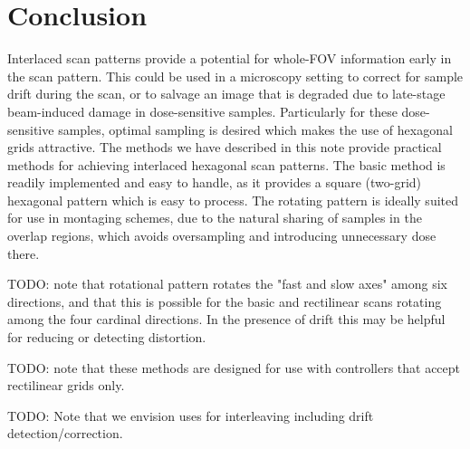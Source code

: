 \documentclass{article}
\begin{document}
\section{Conclusion}
\label{sec:conclusion}

Interlaced scan patterns provide a potential for whole-FOV information early in the scan pattern.
%
This could be used in a microscopy setting to correct for sample drift during the scan, or to salvage an image that is degraded due to late-stage beam-induced damage in dose-sensitive samples.
%
Particularly for these dose-sensitive samples, optimal sampling is desired which makes the use of hexagonal grids attractive.
%
The methods we have described in this note provide practical methods for achieving interlaced hexagonal scan patterns.
%
The basic method is readily implemented and easy to handle, as it provides a square (two-grid) hexagonal pattern which is easy to process.
%
The rotating pattern is ideally suited for use in montaging schemes, due to the natural sharing of samples in the overlap regions, which avoids oversampling and introducing unnecessary dose there.


TODO: note that rotational pattern rotates the "fast and slow axes" among six directions, and that this is possible for the basic and rectilinear scans rotating among the four cardinal directions. In the presence of drift this may be helpful for reducing or detecting distortion.


TODO: note that these methods are designed for use with controllers that accept rectilinear grids only.

TODO: Note that we envision uses for interleaving including drift detection/correction.



\end{document}
